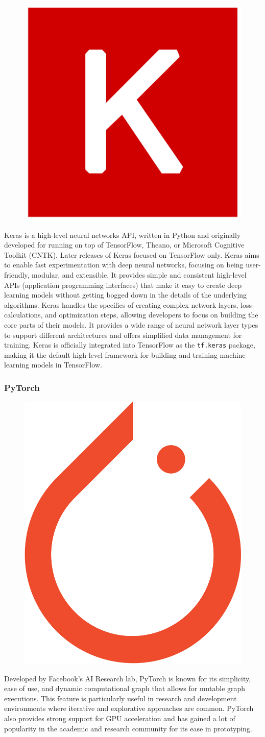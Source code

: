 \begin{figure}
\begin{center}
\includegraphics[width=.75in]{keraslogo.png}
\end{center}
\end{figure}
Keras is a high-level neural networks API, written in Python and originally developed for running on top of TensorFlow, Theano, or Microsoft Cognitive Toolkit (CNTK). Later releases of Keras focused on TensorFlow only. Keras aims to enable fast experimentation with deep neural networks, focusing on being user-friendly, modular, and extensible. It provides simple and consistent high-level APIs (application programming interfaces) that make it easy to create deep learning models without getting bogged down in the details of the underlying algorithms. Keras handles the specifics of creating complex network layers, loss calculations, and optimization steps, allowing developers to focus on building the core parts of their models. It provides a wide range of neural network layer types to support different architectures and offers simplified data management for training. Keras is officially integrated into TensorFlow as the \texttt{tf.keras} package, making it the default high-level framework for building and training machine learning models in TensorFlow.

\subsubsection*{PyTorch}

\begin{figure}
\begin{center}
\includegraphics[width=.75in]{pytorch_logo.png}
\end{center}
\end{figure}
Developed by Facebook's AI Research lab, PyTorch is known for its simplicity, ease of use, and dynamic computational graph that allows for mutable graph executions. This feature is particularly useful in research and development environments where iterative and explorative approaches are common. PyTorch also provides strong support for GPU acceleration and has gained a lot of popularity in the academic and research community for its ease in prototyping.

